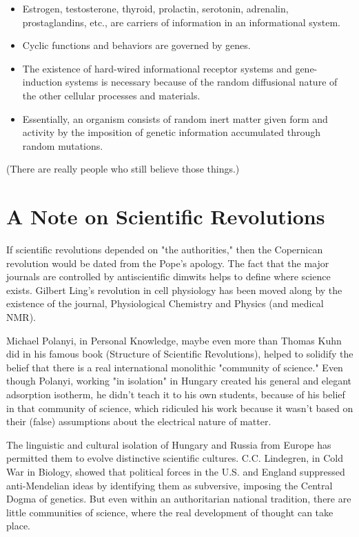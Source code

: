 \documentclass{article}
\begin{document}
\begin{itemize}
    \item Estrogen, testosterone, thyroid, prolactin, serotonin, adrenalin, prostaglandins, etc., are carriers of information in an informational system.
    \item Cyclic functions and behaviors are governed by genes.
    \item The existence of hard-wired informational receptor systems and gene-induction systems is necessary because of the random diffusional nature of the other cellular processes and materials.
    \item Essentially, an organism consists of random inert matter given form and activity by the imposition of genetic information accumulated through random mutations.
\end{itemize}
(There are really people who still believe those things.)

\section*{A Note on Scientific Revolutions}
If scientific revolutions depended on "the authorities," then the Copernican revolution would be dated from the Pope's apology. The fact that the major journals are controlled by antiscientific dimwits helps to define where science exists. Gilbert Ling's revolution in cell physiology has been moved along by the existence of the journal, Physiological Chemistry and Physics (and medical NMR).

Michael Polanyi, in Personal Knowledge, maybe even more than Thomas Kuhn did in his famous book (Structure of Scientific Revolutions), helped to solidify the belief that there is a real international monolithic "community of science." Even though Polanyi, working "in isolation" in Hungary created his general and elegant adsorption isotherm, he didn't teach it to his own students, because of his belief in that community of science, which ridiculed his work because it wasn't based on their (false) assumptions about the electrical nature of matter.

The linguistic and cultural isolation of Hungary and Russia from Europe has permitted them to evolve distinctive scientific cultures. C.C. Lindegren, in Cold War in Biology, showed that political forces in the U.S. and England suppressed anti-Mendelian ideas by identifying them as subversive, imposing the Central Dogma of genetics.  But even within an authoritarian national tradition, there are little communities of science, where the real development of thought can take place.
\end{document}
